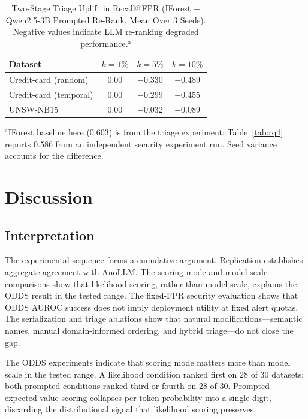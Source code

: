 \documentclass[conference]{IEEEtran}
\begin{document}
\begin{table}[htbp]
\caption{Two-Stage Triage Uplift in Recall@FPR (IForest + Qwen2.5-3B Prompted Re-Rank, Mean Over 3 Seeds). Negative values indicate LLM re-ranking degraded performance.$^{\mathrm{a}}$}
\label{tab:rq7}
\begin{center}
\renewcommand{\arraystretch}{1.2}
\begin{tabular}{|l|c|c|c|}
\hline
\textbf{Dataset} & \textbf{$k=1\%$} & \textbf{$k=5\%$} & \textbf{$k=10\%$} \\
\hline
Credit-card (random)   & 0.00 & $-0.330$ & $-0.489$ \\
Credit-card (temporal) & 0.00 & $-0.299$ & $-0.455$ \\
UNSW-NB15              & 0.00 & $-0.032$ & $-0.089$ \\
\hline
\end{tabular}
\par\smallskip\footnotesize $^{\mathrm{a}}$IForest baseline here (0.603) is from the triage experiment; Table~\ref{tab:rq4} reports 0.586 from an independent security experiment run. Seed variance accounts for the difference.
\end{center}
\end{table}

\section{Discussion}\label{sec:discussion}

\subsection{Interpretation}
The experimental sequence forms a cumulative argument. Replication establishes aggregate agreement with AnoLLM. The scoring-mode and model-scale comparisons show that likelihood scoring, rather than model scale, explains the ODDS result in the tested range. The fixed-FPR security evaluation shows that ODDS AUROC success does not imply deployment utility at fixed alert quotas. The serialization and triage ablations show that natural modifications---semantic names, manual domain-informed ordering, and hybrid triage---do not close the gap.

The ODDS experiments indicate that scoring mode matters more than model scale in the tested range.
A likelihood condition ranked first on 28 of 30 datasets; both prompted conditions ranked third or fourth on 28 of 30.
Prompted expected-value scoring collapses per-token probability into a single digit, discarding the distributional signal that likelihood scoring preserves.
\end{document}
